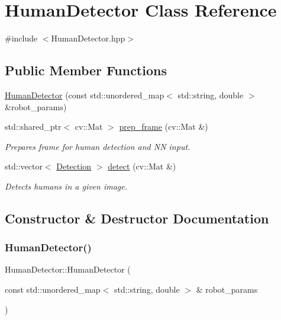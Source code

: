 \hypertarget{class_human_detector}{}\section{Human\+Detector Class Reference}
\label{class_human_detector}


{\ttfamily \#include $<$Human\+Detector.\+hpp$>$}

\subsection*{Public Member Functions}
\begin{DoxyCompactItemize}
\item 
\hyperlink{class_human_detector_a1b7551240bdbc20560aa8f2b6c9dedf4}{Human\+Detector} (const std\+::unordered\+\_\+map$<$ std\+::string, double $>$ \&robot\+\_\+params)
\item 
std\+::shared\+\_\+ptr$<$ cv\+::\+Mat $>$ \hyperlink{class_human_detector_abb95c995b5b11c93103484f0fc9027c5}{prep\+\_\+frame} (cv\+::\+Mat \&)
\begin{DoxyCompactList}\small\item\em Prepares frame for human detection and NN input. \end{DoxyCompactList}\item 
std\+::vector$<$ \hyperlink{struct_detection}{Detection} $>$ \hyperlink{class_human_detector_acd632914e98da1a05d80270b769cfdd3}{detect} (cv\+::\+Mat \&)
\begin{DoxyCompactList}\small\item\em Detects humans in a given image. \end{DoxyCompactList}\end{DoxyCompactItemize}


\subsection{Constructor \& Destructor Documentation}
\mbox{\label{class_human_detector_a1b7551240bdbc20560aa8f2b6c9dedf4}} 
\subsubsection{\texorpdfstring{Human\+Detector()}{HumanDetector()}}
{\footnotesize\ttfamily Human\+Detector\+::\+Human\+Detector (\begin{DoxyParamCaption}\item[{const std\+::unordered\+\_\+map$<$ std\+::string, double $>$ \&}]{robot\+\_\+params }\end{DoxyParamCaption})\hspace{0.3cm}{\ttfamily [inline]}}



